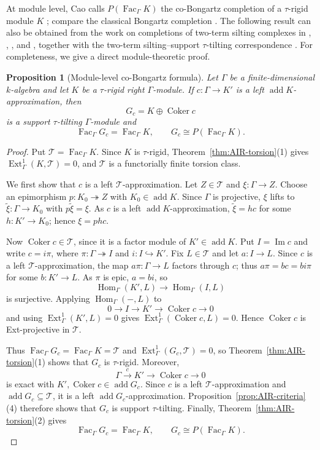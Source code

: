 \documentclass[11pt,reqno]{amsart}
\newtheorem{proposition}[theorem]{Proposition}
\theoremstyle{definition}
\theoremstyle{remark}
\newcommand{\Fac}{\operatorname{Fac}}
\newcommand{\addc}{\operatorname{add}}
\newcommand{\Ext}{\operatorname{Ext}}
\newcommand{\Hom}{\operatorname{Hom}}
\newcommand{\Coker}{\operatorname{Coker}}
\numberwithin{equation}{section}
\begin{document}
At module level, Cao calls $P(\Fac_\Gamma K)$ the co-Bongartz completion of
a $\tau$-rigid module $K$ \cite[Definition~2.10]{Cao}; compare the classical
Bongartz completion \cite{Bongartz}.  The following result can also be obtained
from the work on completions of two-term silting complexes in
\cite[Section~5]{DerksenFei}, \cite[Proposition~2.16]{Aihara},
\cite[Lemma~4.2]{IJY}, and \cite[Lemma~2.2(b)]{Kimura}, together with the
two-term silting--support $\tau$-tilting correspondence
\cite[Theorem~3.2]{AIR}.  For completeness, we give a direct module-theoretic
proof.

\begin{proposition}[Module-level co-Bongartz formula]
\label{prop:module-coBongartz}
Let $\Gamma$ be a finite-dimensional $k$-algebra and let $K$ be a
$\tau$-rigid right $\Gamma$-module.  If
$c:\Gamma\longrightarrow K'$ is a left $\addc K$-approximation, then
\[
 G_c=K\oplus\Coker c
\]
is a support $\tau$-tilting $\Gamma$-module and
\[
 \Fac_\Gamma G_c=\Fac_\Gamma K,
 \qquad
 G_c\cong P(\Fac_\Gamma K).
\]
\end{proposition}

\begin{proof}
Put $\mathcal T=\Fac_\Gamma K$.  Since $K$ is $\tau$-rigid,
Theorem~\ref{thm:AIR-torsion}\textup{(1)} gives
$\Ext_\Gamma^1(K,\mathcal T)=0$, and $\mathcal T$ is a functorially finite
torsion class.

We first show that $c$ is a left $\mathcal T$-approximation.  Let
$Z\in\mathcal T$ and $\xi:\Gamma\to Z$.  Choose an epimorphism
$p:K_0\twoheadrightarrow Z$ with $K_0\in\addc K$.  Since $\Gamma$ is
projective, $\xi$ lifts to $\widetilde\xi:\Gamma\to K_0$ with
$p\widetilde\xi=\xi$.  As $c$ is a left $\addc K$-approximation,
$\widetilde\xi=hc$ for some $h:K'\to K_0$; hence $\xi=phc$.

Now $\Coker c\in\mathcal T$, since it is a factor module of
$K'\in\addc K$.  Put $I=\operatorname{Im}c$ and write $c=i\pi$, where
$\pi:\Gamma\twoheadrightarrow I$ and $i:I\hookrightarrow K'$.  Fix
$L\in\mathcal T$ and let $a:I\to L$.  Since $c$ is a left
$\mathcal T$-approximation, the map $a\pi:\Gamma\to L$ factors through
$c$; thus $a\pi=bc=bi\pi$ for some $b:K'\to L$.  As $\pi$ is epic,
$a=bi$, so
\[
 \Hom_\Gamma(K',L)\longrightarrow\Hom_\Gamma(I,L)
\]
is surjective.  Applying $\Hom_\Gamma(-,L)$ to
\[
 0\longrightarrow I\longrightarrow K'\longrightarrow
 \Coker c\longrightarrow0
\]
and using $\Ext_\Gamma^1(K',L)=0$ gives
$\Ext_\Gamma^1(\Coker c,L)=0$.  Hence $\Coker c$ is Ext-projective in
$\mathcal T$.

Thus $\Fac_\Gamma G_c=\Fac_\Gamma K=\mathcal T$ and
$\Ext_\Gamma^1(G_c,\mathcal T)=0$, so
Theorem~\ref{thm:AIR-torsion}\textup{(1)} shows that $G_c$ is
$\tau$-rigid.  Moreover,
\[
 \Gamma\xrightarrow{c}K'\longrightarrow\Coker c\longrightarrow0
\]
is exact with $K',\Coker c\in\addc G_c$.  Since $c$ is a left
$\mathcal T$-approximation and $\addc G_c\subseteq\mathcal T$, it is a
left $\addc G_c$-approximation.  Proposition~\ref{prop:AIR-criteria}
\textup{(4)} therefore shows that $G_c$ is support $\tau$-tilting.
Finally, Theorem~\ref{thm:AIR-torsion}\textup{(2)} gives
\[
 \Fac_\Gamma G_c=\Fac_\Gamma K,
 \qquad
 G_c\cong P(\Fac_\Gamma K).
\]
\end{proof}
\end{document}
